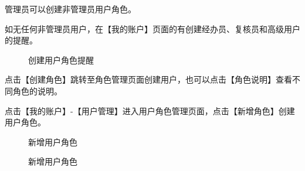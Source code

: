 管理员可以创建非管理员用户角色。 \par

如无任何非管理员用户，在【我的账户】页面的有创建经办员、复核员和高级用户的提醒。\par

\begin{figure}[htbp!]
  \centering
  \caption{创建用户角色提醒}
\end{figure}

点击【创建角色】跳转至角色管理页面创建用户，也可以点击【角色说明】查看不同角色的说明。\par

点击【我的账户】-【用户管理】进入用户角色管理页面，点击【新增角色】创建用户角色。\par

\begin{figure}[htbp!]
  \centering
  \caption{新增用户角色}
\end{figure}

\begin{figure}[htbp!]
  \centering
  \caption{新增用户角色}
\end{figure}